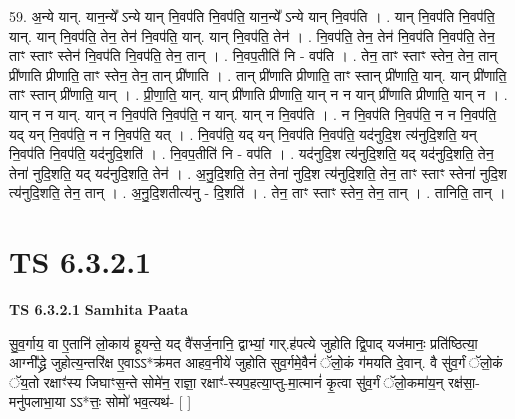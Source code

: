 \documentclass[17pt]{extarticle}
\begin{document}
59. अ॒न्ये यान्. यान॒न्ये᳚ ऽन्ये यान् नि॒वप॑ति नि॒वप॑ति॒ यान॒न्ये᳚ ऽन्ये यान् नि॒वप॑ति । . यान् नि॒वप॑ति नि॒वप॑ति॒ यान्. यान् नि॒वप॑ति॒ तेन॒ तेन॑ नि॒वप॑ति॒ यान्. यान् नि॒वप॑ति॒ तेन॑ । . नि॒वप॑ति॒ तेन॒ तेन॑ नि॒वप॑ति नि॒वप॑ति॒ तेन॒ ताꣳ स्ताꣳ स्तेन॑ नि॒वप॑ति नि॒वप॑ति॒ तेन॒ तान् । . नि॒वप॒तीति॑ नि - वप॑ति । . तेन॒ ताꣳ स्ताꣳ स्तेन॒ तेन॒ तान् प्री॑णाति प्रीणाति॒ ताꣳ स्तेन॒ तेन॒ तान् प्री॑णाति । . तान् प्री॑णाति प्रीणाति॒ ताꣳ स्तान् प्री॑णाति॒ यान्. यान् प्री॑णाति॒ ताꣳ स्तान् प्री॑णाति॒ यान् । . प्री॒णा॒ति॒ यान्. यान् प्री॑णाति प्रीणाति॒ यान् न न यान् प्री॑णाति प्रीणाति॒ यान् न । . यान् न न यान्. यान् न नि॒वप॑ति नि॒वप॑ति॒ न यान्. यान् न नि॒वप॑ति । . न नि॒वप॑ति नि॒वप॑ति॒ न न नि॒वप॑ति॒ यद् यन् नि॒वप॑ति॒ न न नि॒वप॑ति॒ यत् । . नि॒वप॑ति॒ यद् यन् नि॒वप॑ति नि॒वप॑ति॒ यद॑नुदि॒श त्य॑नुदि॒शति॒ यन् नि॒वप॑ति नि॒वप॑ति॒ यद॑नुदि॒शति॑ । . नि॒वप॒तीति॑ नि - वप॑ति । . यद॑नुदि॒श त्य॑नुदि॒शति॒ यद् यद॑नुदि॒शति॒ तेन॒ तेना॑ नुदि॒शति॒ यद् यद॑नुदि॒शति॒ तेन॑ । . अ॒नु॒दि॒शति॒ तेन॒ तेना॑ नुदि॒श त्य॑नुदि॒शति॒ तेन॒ ताꣳ स्ताꣳ स्तेना॑ नुदि॒श त्य॑नुदि॒शति॒ तेन॒ तान् । . अ॒नु॒दि॒शतीत्य॑नु - दि॒शति॑ । . तेन॒ ताꣳ स्ताꣳ स्तेन॒ तेन॒ तान् । . तानिति॒ तान् । \newline
\pagebreak
{}

\section{ TS 6.3.2.1 }

\textbf{TS 6.3.2.1 } \newline
\textbf{Samhita Paata} \newline

सु॒व॒र्गाय॒ वा ए॒तानि॑ लो॒काय॑ हूयन्ते॒ यद् वै॑सर्ज॒नानि॒ द्वाभ्यां॒ गार्.ह॑पत्ये जुहोति द्वि॒पाद् यज॑मानः॒ प्रति॑ष्ठित्या॒ आग्नी᳚द्ध्रे जुहोत्य॒न्तरि॑क्ष ए॒वाऽऽ*क्र॑मत आहव॒नीये॑ जुहोति सुव॒र्गमे॒वैनं॑ ॅलो॒कं ग॑मयति दे॒वान्. वै सु॑व॒र्गं ॅलो॒कं ॅय॒तो रक्षाꣳ॑स्य जिघाꣳस॒न्ते सोमे॑न॒ राज्ञा॒ रक्षाꣳ॑-स्यप॒हत्या॒प्तु-मा॒त्मानं॑ कृ॒त्वा सु॑व॒र्गं ॅलो॒कमा॑य॒न् रक्ष॑सा॒-मनु॑पलाभा॒या ऽऽ*त्तः॒ सोमो॑ भव॒त्यथ॑- [  ] \newline
\end{document}
